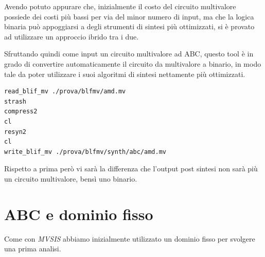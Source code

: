 \documentclass[
]{book}
\begin{document}
Avendo potuto appurare che, inizialmente il costo del circuito multivalore possiede dei costi più bassi per via del minor numero di input, ma che la logica binaria può appoggiarsi a degli strumenti di sintesi più ottimizzati, si è provato ad utilizzare un approccio ibrido tra i due.

Sfruttando quindi come input un circuito multivalore ad ABC, questo tool è in grado di convertire automaticamente il circuito da multivalore a binario, in modo tale da poter utilizzare i suoi algoritmi di sintesi nettamente più ottimizzati.

\begin{verbatim}
read_blif_mv ./prova/blfmv/amd.mv
strash
compress2
cl
resyn2
cl
write_blif_mv ./prova/blfmv/synth/abc/amd.mv
\end{verbatim}

Rispetto a prima però vi sarà la differenza che l'output post sintesi non sarà più un circuito multivalore, bensì uno binario.

\newpage

\hypertarget{abc-e-dominio-fisso}{%
\section{ABC e dominio fisso}\label{abc-e-dominio-fisso}}

Come con \emph{MVSIS} abbiamo inizialmente utilizzato un dominio fisso per svolgere una prima analisi.
\end{document}
